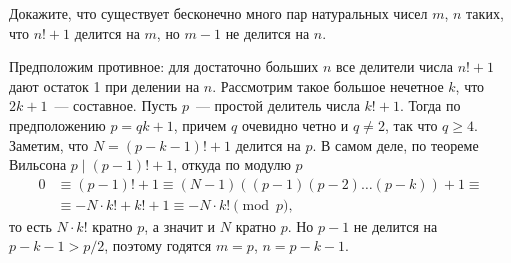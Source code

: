 \problem
Докажите, что существует бесконечно много пар натуральных чисел $m$, $n$ таких,
что $n! + 1$ делится на $m$, но $m - 1$ не делится на $n$.

\solution
Предположим противное: для достаточно больших $n$ все делители числа $n! + 1$
дают остаток 1 при делении на $n$.
Рассмотрим такое большое нечетное $k$, что $2 k + 1$~--- составное.
Пусть $p$~--- простой делитель числа $k! + 1$.
Тогда по предположению $p = q k + 1$, причем $q$ очевидно четно и $q \neq 2$,
так что $q \geq 4$.
Заметим, что $N = (p - k - 1)! + 1$ делится на $p$.
В самом деле, по теореме Вильсона $p \mid (p - 1)! + 1$, откуда по модулю $p$
\begin{align*}
    0
&\equiv
    (p - 1)! + 1
\equiv
    (N - 1) ((p - 1) (p - 2) \ldots (p - k)) + 1
\equiv\\&\equiv
    -N \cdot k! + k! + 1
\equiv
    -N \cdot k!
\pmod{p},
\end{align*}
то есть $N \cdot k!$ кратно $p$, а значит и $N$ кратно $p$.
Но $p - 1$ не делится на $p - k - 1 > p / 2$, поэтому годятся
$m = p$, $n = p - k - 1$.

\endproblem
